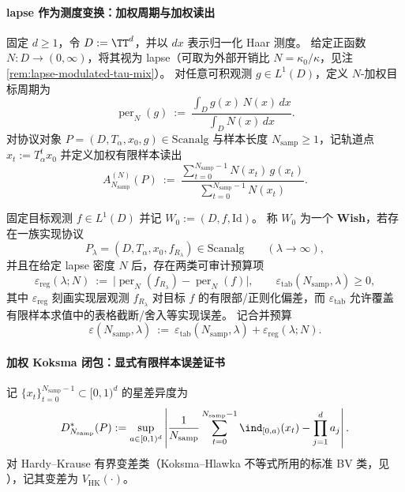 \paragraph{lapse 作为测度变换：加权周期与加权读出}
固定 \(d\ge 1\)，令 \(D:=\TT^d\)，并以 \(dx\) 表示归一化 Haar 测度。
给定正函数 \(N:D\to(0,\infty)\)，将其视为 lapse（可取为外部开销比 \(N=\kappa_0/\kappa\)，见注 \ref{rem:lapse-modulated-tau-mix}）。
对任意可积观测 \(g\in L^1(D)\)，定义 \(N\)-加权目标周期为
\begin{equation}\label{eq:op-algebra-perN-def}
\operatorname{per}_{N}(g)
~:=~
\frac{\int_{D} g(x)\,N(x)\,dx}{\int_{D} N(x)\,dx}.
\end{equation}
对协议对象 \(P=(D,T_\alpha,x_0,g)\in\mathrm{Scanalg}\) 与样本长度 \(N_{\mathrm{samp}}\ge 1\)，记轨道点 \(x_t:=T_\alpha^t x_0\) 并定义加权有限样本读出
\begin{equation}\label{eq:op-algebra-weighted-readout-def}
A^{(N)}_{N_{\mathrm{samp}}}(P)
~:=~
\frac{\sum_{t=0}^{N_{\mathrm{samp}}-1} N(x_t)\,g(x_t)}{\sum_{t=0}^{N_{\mathrm{samp}}-1} N(x_t)}.
\end{equation}

\begin{definition}\label{def:op-algebra-wish}
固定目标观测 \(f\in L^1(D)\) 并记 \(W_0:=(D,f,\mathrm{Id})\)。
称 \(W_0\) 为一个 \textbf{Wish}，若存在一族实现协议
\[
P_\lambda=(D,T_\alpha,x_0,f_{R_\lambda})\in\mathrm{Scanalg}\qquad(\lambda\to\infty),
\]
并且在给定 lapse 密度 \(N\) 后，存在两类可审计预算项
\[
\varepsilon_{\mathrm{reg}}(\lambda;N)
~:=~
\bigl|\operatorname{per}_{N}(f_{R_\lambda})-\operatorname{per}_{N}(f)\bigr|,
\qquad
\varepsilon_{\mathrm{tab}}(N_{\mathrm{samp}},\lambda)\ge 0,
\]
其中 \(\varepsilon_{\mathrm{reg}}\) 刻画实现层观测 \(f_{R_\lambda}\) 对目标 \(f\) 的有限部/正则化偏差，而 \(\varepsilon_{\mathrm{tab}}\) 允许覆盖有限样本求值中的表格截断/舍入等实现误差。
记合并预算
\begin{equation}\label{eq:op-algebra-wish-eps-def}
\varepsilon(N_{\mathrm{samp}},\lambda)
~:=~
\varepsilon_{\mathrm{tab}}(N_{\mathrm{samp}},\lambda)+\varepsilon_{\mathrm{reg}}(\lambda;N).
\end{equation}
\end{definition}

\paragraph{加权 Koksma 闭包：显式有限样本误差证书}
记 \(\{x_t\}_{t=0}^{N_{\mathrm{samp}}-1}\subset [0,1)^d\) 的星差异度为
\begin{equation}\label{eq:op-algebra-star-discrepancy}
D_{N_{\mathrm{samp}}}^{\ast}(P)
:=\sup_{a\in[0,1)^d}\left|
\frac{1}{N_{\mathrm{samp}}}\sum_{t=0}^{N_{\mathrm{samp}}-1}\ind_{[0,a)}(x_t)-\prod_{j=1}^{d} a_j
\right|.
\end{equation}
对 Hardy--Krause 有界变差类（Koksma--Hlawka 不等式所用的标准 BV 类，见 \cite{KuipersNiederreiter1974}），记其变差为 \(V_{\mathrm{HK}}(\cdot)\)。

